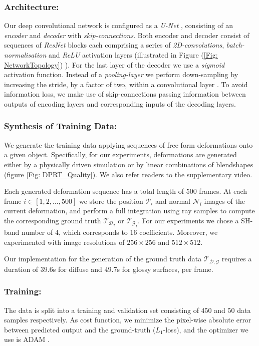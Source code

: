 \subsubsection*{Architecture: \\} 
Our deep convolutional network is configured as a \textit{U-Net}  \cite{U-Net}, consisting of an \textit{encoder} and \textit{decoder} with \textit{skip-connections}. Both encoder and decoder consist of sequences of \textit{ResNet} blocks \cite{ResNet} each comprising a series of \textit{2D-convolutions}, \textit{batch-normalisation} and \textit{ReLU} activation layers (illustrated in Figure (\ref{Fig: NetworkTopology}) ). For the last layer of the decoder we use a \textit{sigmoid} activation function. Instead of a \textit{pooling-layer} we perform down-sampling by increasing the stride, by a factor of two, within a convolutional layer \cite{StridingConv}. To avoid information loss,  we make use of skip-connections passing information between outputs of encoding layers and corresponding inputs of the decoding layers.

\subsubsection*{Synthesis of Training Data:\\}
We generate the training data applying sequences of free form deformations onto a given object. Specifically, for our experiments, deformations are generated either by a physically driven simulation or by linear combinations of blendshapes (figure \ref{Fig: DPRT_Quality}). We also refer readers to the supplementary video. 

Each generated deformation sequence has a total length of 500 frames. 
At each frame $i \in [1,2,\dots,500]$ we store the position $\mathcal{P}_i$  and normal $\mathcal{N}_i$ images of the current deformation, and perform a full integration using ray samples to compute the corresponding ground truth $\mathcal{T_D}_i$ or $\mathcal{T_G}_i$. For our experiments we chose a SH-band number of $4$, which corresponds to $16$ coefficients. Moreover, we experimented with image resolutions of $256 \times 256$ and $512 \times 512$. 

Our implementation for the generation of the ground truth data $\mathcal{T_{D,G}}$ requires a duration of $39.6$s for diffuse and $49.7$s for glossy surfaces, per frame.

\subsubsection*{Training: \\} 
The data is split into a training and validation set consisting of $450$ and $50$ data samples respectively. As cost function, we minimize the pixel-wise absolute error between predicted output and the ground-truth ($L_1$-loss), and the optimizer we use is ADAM \cite{ADAM}. 

